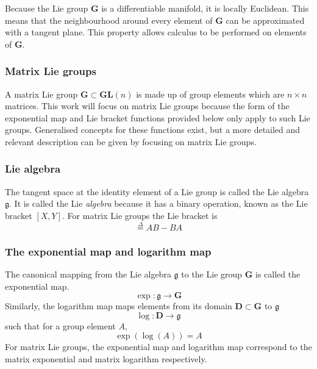 		Because the Lie group $\mathbf{G}$ is a differentiable manifold, it is locally Euclidean. This means that the neighbourhood around every element of $\mathbf{G}$ can be approximated with a tangent plane. This property allows calculus to be performed on elements of $\mathbf{G}$.
		
		\subsubsection{Matrix Lie groups}
			A matrix Lie group $\mathbf{G} \subset \mathbf{GL}(n)$ is made up of group elements which are $n \times n$ matrices.
			This work will focus on matrix Lie groups because the form of the exponential map and Lie bracket functions provided below only apply to such Lie groups. Generalised concepts for these functions exist, but a more detailed and relevant description can be given by focusing on matrix Lie groups.
		
		\subsubsection{Lie algebra}
			The tangent space at the identity element of a Lie group is called the Lie algebra $\mathfrak{g}$. It is called the Lie \textit{algebra} because it has a binary operation, known as the Lie bracket $[X,Y]$. For matrix Lie groups the Lie bracket is
			\begin{equation}
				[A,B] \stackrel{\Delta}{=} AB-BA
			\end{equation}
			
		\subsubsection{The exponential map and logarithm map}	
			The canonical mapping from the Lie algebra $\mathfrak{g}$ to the Lie group $\mathbf{G}$ is called the exponential map.
			\begin{equation}
				\exp: \mathfrak{g} \rightarrow \mathbf{G}
			\end{equation}			
			Similarly, the logarithm map maps elements from its domain $\mathbf{D} \subset \mathbf{G}$ to $\mathfrak{g}$
			\begin{equation}
				\log: \mathbf{D} \rightarrow \mathfrak{g}
			\end{equation}
			such that for a group element $A$,
			\begin{equation}
				\exp(\log(A)) = A
			\end{equation}
			For matrix Lie groups, the exponential map and logarithm map correspond to the matrix exponential and matrix logarithm respectively.
						
